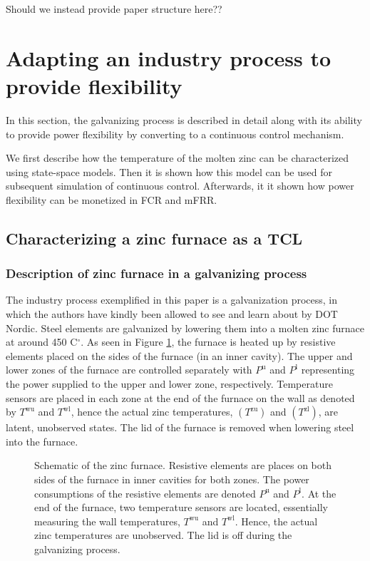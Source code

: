 \documentclass[lettersize,journal]{IEEEtran}
\begin{document}
    {\color{red}Should we instead provide paper structure here??}

\section{Adapting an industry process to provide flexibility}\label{sec:zinc_furnace_description}

In this section, the galvanizing process is described in detail along with its ability to provide power flexibility by converting to a continuous control mechanism.

We first describe how the temperature of the molten zinc can be characterized using state-space models. Then it is shown how this model can be used for subsequent simulation of continuous control. Afterwards, it it shown how power flexibility can be monetized in FCR and mFRR.

\subsection{Characterizing a zinc furnace as a TCL}



\subsubsection{Description of zinc furnace in a galvanizing process}

The industry process exemplified in this paper is a galvanization process, in which the authors have kindly been allowed to see and learn about by DOT Nordic. Steel elements are galvanized by lowering them into a molten zinc furnace at around 450 C$^{\circ}$. As seen in Figure \ref{fig:furnace_schematic_tikz}, the furnace is heated up by resistive elements placed on the sides of the furnace (in an inner cavity). The upper and lower zones of the furnace are controlled separately with $P^{\text{u}}$ and $P^{\text{l}}$ representing the power supplied to the upper and lower zone, respectively. Temperature sensors are placed in each zone at the end of the furnace on the wall as denoted by $T^{\text{wu}}$ and $T^{\text{wl}}$, hence the actual zinc temperatures, $(T^{\text{zu}})$ and $(T^{\text{zl}})$, are latent, unobserved states. The lid of the furnace is removed when lowering steel into the furnace.

\begin{figure}[!t]
    \centering
    
    \caption{Schematic of the zinc furnace. Resistive elements are places on both sides of the furnace in inner cavities for both zones. The power consumptions of the resistive elements are denoted $P^{\text{u}}$ and $P^{\text{l}}$. At the end of the furnace, two temperature sensors are located, essentially measuring the wall temperatures, $T^{\text{wu}}$ and $T^{\text{wl}}$. Hence, the actual zinc temperatures are unobserved. The lid is off during the galvanizing process.}
    \label{fig:furnace_schematic_tikz}
\end{figure}
\end{document}

